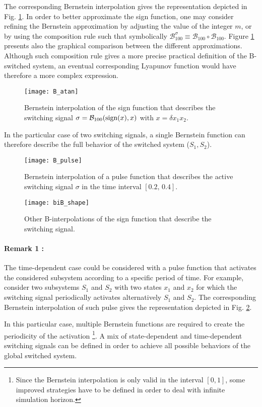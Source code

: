 \documentclass[12pt]{article}
\begin{document}
 The corresponding Bernstein interpolation gives the representation depicted in Fig. \ref{fig:B_atan}. 
 In order to better approximate the sign function, one may consider refining the Bernstein approximation by adjusting the value of the integer $m$, or by using the composition 
 rule such that symbolically $\mathcal{B}^{\sigma}_{100} \equiv \mathcal{B}_{100} \circ \mathcal{B}_{100}$. Figure \ref{fig:B_atan} presents also the graphical comparison between the different approximations.
 Although such composition rule gives a more precise practical definition of the B-switched system, an eventual corresponding Lyapunov function would have therefore a more complex 
 expression.
 
 
\begin{figure}[!h]
\centering
\texttt{[image: B\_atan]}
\caption{Bernstein interpolation of the sign function that describes the switching signal $\sigma = \mathcal{B}_{100}(\hbox{sign}(x),x)$ with $x = \delta x_1 x_2 $.}
\label{fig:B_atan}
\end{figure}
In the particular case of two switching signals, a single Bernstein function can therefore describe the full behavior of the switched system ($S_1, S_2$). 
\begin{figure}[!h]
\centering
\texttt{[image: B\_pulse]}
\caption{Bernstein interpolation of a pulse function that describes the active switching signal $\sigma$ in the time interval $[0.2, \, 0.4]$.}
\label{fig:B_pulse}
\end{figure}
\begin{figure}[!h]
\centering
\texttt{[image: biB\_shape]}
\caption{Other B-interpolations of the sign function that describe the switching signal.}
\label{fig:biB_shape}
\end{figure}


\paragraph{Remark 1 :} 
The time-dependent case could be considered with a pulse function that activates the considered subsystem according to a specific period of time. For example, consider two subsystems 
 $S_1$ and $S_2$ with two states $x_1$ and $x_2$ for which the switching signal periodically activates alternatively $S_1$ and $S_2$. The corresponding Bernstein interpolation 
 of such pulse gives the representation depicted in Fig. \ref{fig:B_pulse}.
 
\noindent
In this particular case, multiple Bernstein functions are required to create the periodicity of the activation \footnote{Since the Bernstein interpolation is only valid in 
the interval $[0, 1]$, some improved strategies have to be defined in order to deal with infinite simulation horizon.}. A mix of state-dependent and time-dependent switching 
signals can be defined in order to achieve all possible behaviors of the global switched system.
\end{document}
